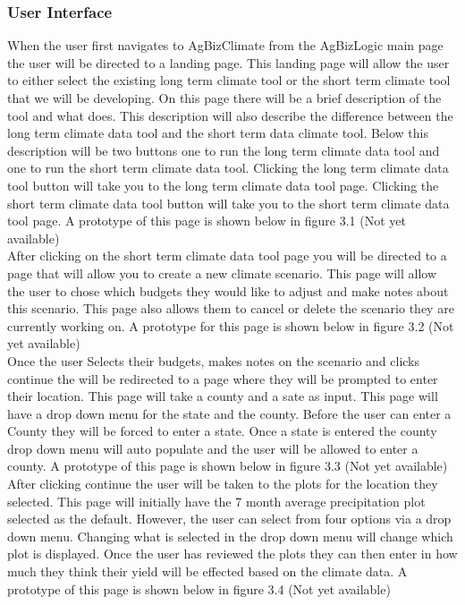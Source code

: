 \documentclass[onecolumn, draftclsnofoot,10pt, compsoc]{article}
\begin{document}
        \subsubsection{User Interface}
					When the user first navigates to AgBizClimate from the AgBizLogic main page the user will be directed to a landing page. This landing page will allow the user to either select the existing long term climate tool or the short term climate tool that we will be developing. On this page there will be a brief description of the tool and what does. This description will also describe the difference between the long term climate data tool and the short term data climate tool. Below this description will be two buttons one to run the long term climate data tool and one to run the short term climate data tool. Clicking the long term climate data tool button will take you to the long term climate data tool page. Clicking the short term climate data tool button will take you to the short term climate data tool page. A prototype of this page is shown below in figure 3.1 (Not yet available)\\
					
					After clicking on the short term climate data tool page you will be directed to a page that will allow you to create a new climate scenario. This page will allow the user to chose which budgets they would like to adjust and make notes about this scenario. This page also allows them to cancel or delete the scenario they are currently working on. A prototype for this page is shown below in figure 3.2 (Not yet available)\\
					
					Once the user Selects their budgets, makes notes on the scenario and clicks continue the will be redirected to a page where they will be prompted to enter their location. This page will take a county and a sate as input. This page will have a drop down menu for the state and the county. Before the user can enter a County they will be forced to enter a state. Once a state is entered the county drop down menu will auto populate and the user will be allowed to enter a county. A prototype of this page is shown below in figure 3.3 (Not yet available)\\
					
					After clicking continue the user will be taken to the plots for the location they selected. This page will initially have the 7 month average precipitation plot selected as the default. However, the user can select from four options via a drop down menu. Changing what is selected in the drop down menu will change which plot is displayed. Once the user has reviewed the plots they can then enter in how much they think their yield will be effected based on the climate data. A prototype of this page is shown below in figure 3.4 (Not yet available)\\
					
\end{document}
